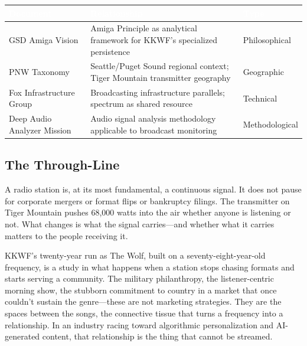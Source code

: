 \documentclass[11pt,letterpaper]{article}
\newcommand{\stageheader}[2]{%
  \noindent\colorbox{#2}{\makebox[\textwidth][l]{%
    \textcolor{white}{\bfseries\sffamily\hspace{6pt}#1\hspace{6pt}}}}%
  \vspace{0.5em}\par%
}
\newcommand{\tableheader}[1]{\textbf{\sffamily\textcolor{white}{#1}}}
\begin{document}
\begin{center}
\begin{tabularx}{\textwidth}{L{4cm}XC{2.5cm}}
\toprule
{}
\tableheader{Document} & \tableheader{Relationship} & \tableheader{Type} \\
\midrule
GSD Amiga Vision & Amiga Principle as analytical framework for KKWF's specialized persistence & Philosophical \\
PNW Taxonomy & Seattle/Puget Sound regional context; Tiger Mountain transmitter geography & Geographic \\
Fox Infrastructure Group & Broadcasting infrastructure parallels; spectrum as shared resource & Technical \\
Deep Audio Analyzer Mission & Audio signal analysis methodology applicable to broadcast monitoring & Methodological \\
\bottomrule
\end{tabularx}
\end{center}

\subsection{The Through-Line}

A radio station is, at its most fundamental, a continuous signal. It does not pause for corporate mergers or format flips or bankruptcy filings. The transmitter on Tiger Mountain pushes 68,000 watts into the air whether anyone is listening or not. What changes is what the signal carries---and whether what it carries matters to the people receiving it.

KKWF's twenty-year run as The Wolf, built on a seventy-eight-year-old frequency, is a study in what happens when a station stops chasing formats and starts serving a community. The military philanthropy, the listener-centric morning show, the stubborn commitment to country in a market that once couldn't sustain the genre---these are not marketing strategies. They are the spaces between the songs, the connective tissue that turns a frequency into a relationship. In an industry racing toward algorithmic personalization and AI-generated content, that relationship is the thing that cannot be streamed.

\newpage
\stageheader{STAGE 2 --- RESEARCH REFERENCE}{secondary}
\end{document}
